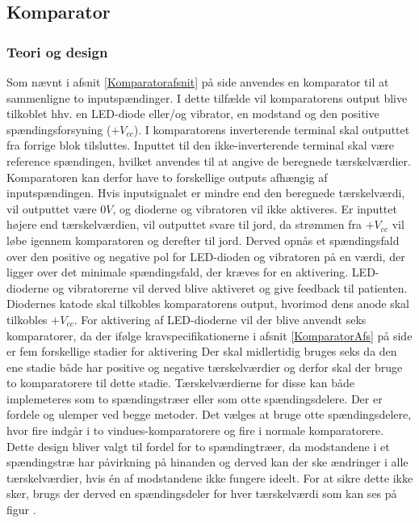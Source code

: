 \subsection{Komparator}
\subsubsection{Teori og design}
Som nævnt i afsnit \ref{Komparatorafsnit} på side \pageref{Komparatorafsnit} anvendes en komparator til at sammenligne to inputspændinger. I dette tilfælde vil komparatorens output blive tilkoblet hhv. en LED-diode eller/og vibrator, en modstand og den positive spændingsforsyning ($+V_{cc}$). I komparatorens inverterende terminal skal outputtet fra forrige blok tilsluttes. Inputtet til den ikke-inverterende terminal skal være reference spændingen, hvilket anvendes til at angive de beregnede tærskelværdier. Komparatoren kan derfor have to forskellige outputs afhængig af inputspændingen. Hvis inputsignalet er mindre end den beregnede tærskelværdi, vil outputtet være $0V$, og dioderne og vibratoren vil ikke aktiveres. Er inputtet højere end tærskelværdien, vil outputtet svare til jord, da strømmen fra $+V_{cc}$ vil løbe igennem komparatoren og derefter til jord. Derved opnås et spændingsfald over den positive og negative pol for LED-dioden og vibratoren på en værdi, der ligger over det minimale spændingsfald, der kræves for en aktivering. LED-dioderne og vibratorerne vil derved blive aktiveret og give feedback til patienten. \\
Diodernes katode skal tilkobles komparatorens output, hvorimod dens anode skal tilkobles $+V_{cc}$. For aktivering af LED-dioderne vil der blive anvendt seks komparatorer, da der ifølge kravspecifikationerne i afsnit \ref{KomparatorAfs} på side \pageref{KomparatorAfs} er fem forskellige stadier for aktivering Der skal midlertidig bruges seks da den ene stadie både har positive og negative tærskelværdier og derfor skal der bruge to komparatorere til dette stadie. Tærskelværdierne for disse kan både implemeteres som to spændingstræer eller som otte spændingsdelere. Der er fordele og ulemper ved begge metoder. Det vælges at bruge otte spændingsdelere, hvor fire indgår i to vindues-komparatorere og fire i normale komparatorere. 
Dette design bliver valgt til fordel for to spændingtræer, da modstandene i et spændingstræ har påvirkning på hinanden og derved kan der ske ændringer i alle tærskelværdier, hvis én af modstandene ikke fungere ideelt. For at sikre dette ikke sker, brugs der derved en spændingsdeler for hver tærskelværdi som kan ses på figur .
